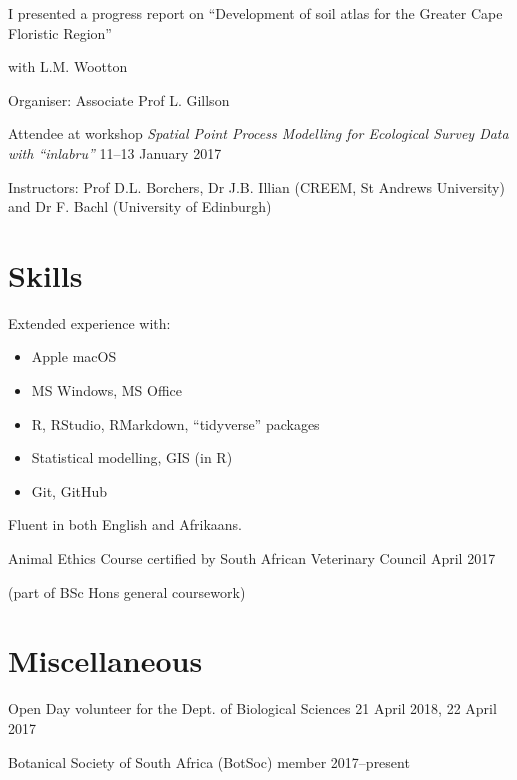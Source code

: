 \documentclass[]{article}
\providecommand{\tightlist}{%
  \setlength{\itemsep}{0pt}\setlength{\parskip}{0pt}}
\begin{document}
\par

I presented a progress report on ``Development of soil atlas for the
Greater Cape Floristic Region''

\par

with L.M. Wootton

\par

Organiser: Associate Prof L. Gillson

Attendee at workshop \emph{Spatial Point Process Modelling for
Ecological Survey Data with ``inlabru''} \hfill 11--13 January 2017

\par

Instructors: Prof D.L. Borchers, Dr J.B. Illian (CREEM, St Andrews
University) and Dr F. Bachl (University of Edinburgh)

\hypertarget{skills}{%
\section{Skills}\label{skills}}

Extended experience with:

\begin{itemize}
\tightlist
\item
  Apple macOS
\item
  MS Windows, MS Office
\item
  R, RStudio, RMarkdown, ``tidyverse'' packages
\item
  Statistical modelling, GIS (in R)
\item
  Git, GitHub
\end{itemize}

Fluent in both English and Afrikaans.

Animal Ethics Course certified by South African Veterinary Council
\hfill April 2017

\par

(part of BSc Hons general coursework)

\hypertarget{miscellaneous}{%
\section{Miscellaneous}\label{miscellaneous}}

Open Day volunteer for the Dept. of Biological Sciences \hfill 21 April
2018, 22 April 2017

Botanical Society of South Africa (BotSoc) member \hfill 2017--present
\end{document}
